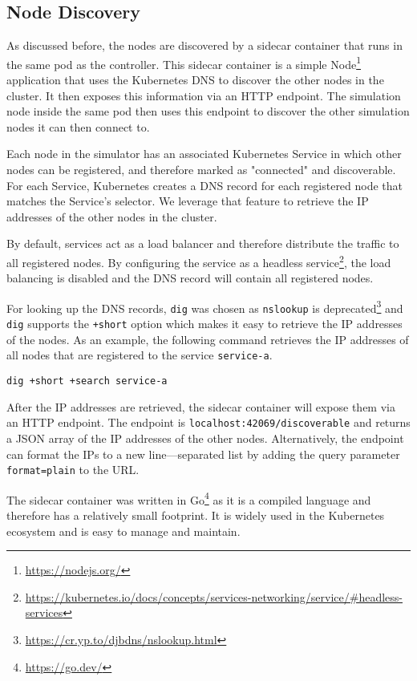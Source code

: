 \subsection {Node Discovery}

As discussed before, the nodes are discovered by a sidecar container that runs in the same pod as the controller.
This sidecar container is a simple Node\footnote{\url{https://nodejs.org/}} application that uses the Kubernetes DNS to discover the other nodes in the cluster.
It then exposes this information via an HTTP endpoint.
The simulation node inside the same pod then uses this endpoint to discover the other simulation nodes it can then connect to.

Each node in the simulator has an associated Kubernetes Service in which other nodes can be registered, and therefore marked as "connected" and discoverable.
For each Service, Kubernetes creates a DNS record for each registered node that matches the Service's selector.
We leverage that feature to retrieve the IP addresses of the other nodes in the cluster.

By default, services act as a load balancer and therefore distribute the traffic to all registered nodes. By configuring the service as a headless service\footnote{\url{https://kubernetes.io/docs/concepts/services-networking/service/\#headless-services}}, the load balancing is disabled and the DNS record will contain all registered nodes.


For looking up the DNS records, \verb|dig| was chosen as \verb|nslookup| is deprecated\footnote{\url{https://cr.yp.to/djbdns/nslookup.html}} and \verb|dig| supports the \verb|+short| option which makes it easy to retrieve the IP addresses of the nodes. As an example, the following command retrieves the IP addresses of all nodes that are registered to the service \verb|service-a|.

\begin{verbatim}
dig +short +search service-a
\end{verbatim}

After the IP addresses are retrieved, the sidecar container will expose them via an HTTP endpoint. The endpoint is \verb|localhost:42069/discoverable| and returns a JSON array of the IP addresses of the other nodes. Alternatively, the endpoint can format the IPs to a new line—separated list by adding the query parameter \verb|format=plain| to the URL.

The sidecar container was written in Go\footnote{\url{https://go.dev/}} as it is a compiled language and therefore has a relatively small footprint. It is widely used in the Kubernetes ecosystem and is easy to manage and maintain.

